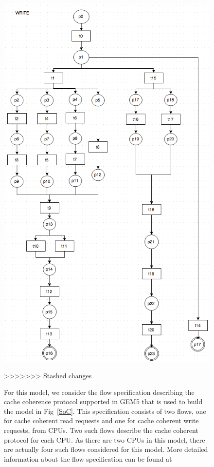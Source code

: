 \documentclass[conference]{IEEEtran}
\begin{document}
\begin{figure} 
\centerline{
\includegraphics[width=3.7In]{figures/Fig5.png}}
>>>>>>> Stashed changes



For this model, we consider the flow specification describing the cache coherence protocol supported in GEM5 that is used to build the model in Fig~\ref{SoC}.  This specification consists of two flows, one for cache coherent read requests and one for  cache coherent write requests, from CPUs.  Two such flows describe the cache coherent protocol for each CPU.  As there are two CPUs in this model, there are actually four such flows considered for this model.  More detailed information about the flow specification can be found at 



\end{figure}
\end{document}
